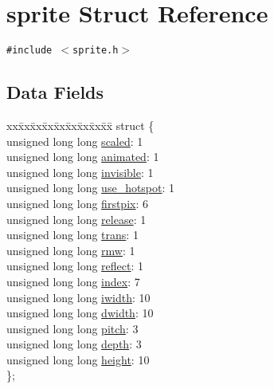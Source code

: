 \hypertarget{structsprite}{
\section{sprite Struct Reference}
\label{structsprite}
}
{\tt \#include $<$sprite.h$>$}

\subsection*{Data Fields}
\begin{CompactItemize}
\item 
\begin{tabbing}
xx\=xx\=xx\=xx\=xx\=xx\=xx\=xx\=xx\=\kill
struct \{\\
\>unsigned long long \hyperlink{structsprite_a394695544784a6b64e10a5048593387}{scaled}: 1\\
\>unsigned long long \hyperlink{structsprite_daf6656b292f5f6236c8dd3ea4457735}{animated}: 1\\
\>unsigned long long \hyperlink{structsprite_c96a2ecd91402d23902a510da5d0227f}{invisible}: 1\\
\>unsigned long long \hyperlink{structsprite_abf5eff390d7222c61b15811512088d9}{use\_hotspot}: 1\\
\>unsigned long long \hyperlink{structsprite_b546d57d6618244b7d1b120ffe564ab5}{firstpix}: 6\\
\>unsigned long long \hyperlink{structsprite_88d4cd0b2d0bfa828d0801a964a53afc}{release}: 1\\
\>unsigned long long \hyperlink{structsprite_5f50a077f6202430f741e41254a3c55d}{trans}: 1\\
\>unsigned long long \hyperlink{structsprite_b0fd324a0b22a49f4d7bf9443285542c}{rmw}: 1\\
\>unsigned long long \hyperlink{structsprite_baf8f4f465918546d5ae6603b978f39f}{reflect}: 1\\
\>unsigned long long \hyperlink{structsprite_fdbad9f27ebbe556fbe1b074a7ff4415}{index}: 7\\
\>unsigned long long \hyperlink{structsprite_9760cacbb8af137eebd03411527cfc98}{iwidth}: 10\\
\>unsigned long long \hyperlink{structsprite_a487d38c3308266aa5c45f8604b0113c}{dwidth}: 10\\
\>unsigned long long \hyperlink{structsprite_3510411d9f6637c3a164f277801c98bd}{pitch}: 3\\
\>unsigned long long \hyperlink{structsprite_95000d86cccbadcd1222da63b9a0aa75}{depth}: 3\\
\>unsigned long long \hyperlink{structsprite_8c4e729d80e000f3ffe6896bde16ec56}{height}: 10\\
\}; \\


\end{tabbing}
\end{CompactItemize}
